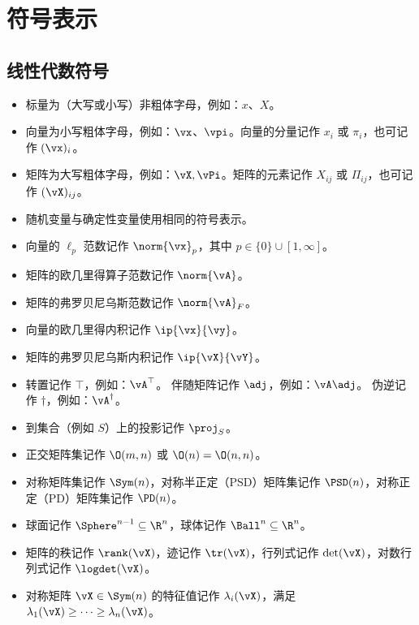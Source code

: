 
\chapter*{符号表示}


\section*{线性代数符号}
\begin{itemize}
    \item 标量为（大写或小写）非粗体字母，例如：\(x\)、\(X\)。
    \item 向量为小写粗体字母，例如：\(\vx\)、\(\vpi\)。向量的分量记作 \(x_{i}\) 或 \(\pi_{i}\)，也可记作 \((\vx)_{i}\)。
    \item 矩阵为大写粗体字母，例如：\(\vX, \vPi\)。矩阵的元素记作 \(X_{ij}\) 或 \(\Pi_{ij}\)，也可记作 \((\vX)_{ij}\)。
    \item 随机变量与确定性变量使用相同的符号表示。
    \item 向量的 \(\ell_{p}\) 范数记作 \(\norm{\vx}_{p}\)，其中 \(p \in \{0\} \cup [1, \infty]\)。
    \item 矩阵的欧几里得算子范数记作 \(\norm{\vA}\)。
    \item 矩阵的弗罗贝尼乌斯范数记作 \(\norm{\vA}_{F}\)。
    \item 向量的欧几里得内积记作 \(\ip{\vx}{\vy}\)。
    \item 矩阵的弗罗贝尼乌斯内积记作 \(\ip{\vX}{\vY}\)。
    \item 转置记作 \(\top\)，例如：\(\vA^{\top}\)。 %
    伴随矩阵记作 $\adj$，例如：$\vA\adj$。 %
    伪逆记作 \(\dagger\)，例如：\(\vA^{\dagger}\)。
    \item 到集合（例如 \(S\)）上的投影记作 \(\proj_{S}\)。
    \item 正交矩阵集记作 \(\O(m, n)\) 或 \(\O(n) = \O(n, n)\)。
    \item 对称矩阵集记作 \(\Sym(n)\)，对称半正定（PSD）矩阵集记作 \(\PSD(n)\)，对称正定（PD）矩阵集记作 \(\PD(n)\)。
    \item 球面记作 \(\Sphere^{n - 1} \subseteq \R^{n}\)，球体记作 \(\Ball^{n} \subseteq \R^{n}\)。
    \item 矩阵的秩记作 \(\rank(\vX)\)，迹记作 \(\tr(\vX)\)，行列式记作 \(\det(\vX)\)，对数行列式记作 \(\logdet(\vX)\)。
    \item 对称矩阵 \(\vX \in \Sym(n)\) 的特征值记作 \(\lambda_{i}(\vX)\)，满足 \(\lambda_{1}(\vX) \geq \cdots \geq \lambda_{n}(\vX)\)。

\end{itemize}
